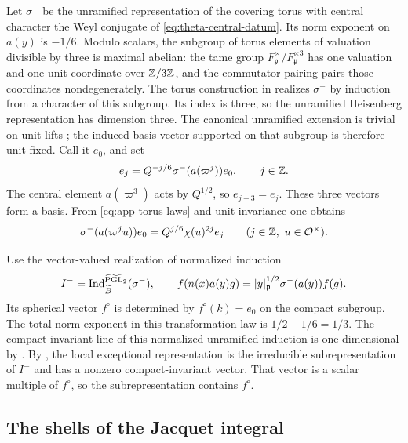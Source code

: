 Let \(\sigma^-\) be the unramified representation of the covering
torus with central character the Weyl conjugate of
\eqref{eq:theta-central-datum}.  Its norm exponent on \(a(y)\) is
\(-1/6\).  Modulo scalars, the subgroup of torus elements of
valuation divisible by three is maximal abelian: the tame group
\(F_{\mathfrak p}^\times/F_{\mathfrak p}^{\times3}\) has one
valuation and one unit coordinate over \(\mathbb{Z}/3\mathbb{Z}\), and the
commutator pairing pairs those coordinates nondegenerately.
The torus construction in \cite[Section~0.3, pp.~54--55, and
Section~I.1, p.~58]{KP84} realizes \(\sigma^-\) by induction from a
character of this subgroup.  Its index is three, so the unramified
Heisenberg representation has dimension three.  The canonical
unramified extension is trivial on unit lifts
\cite[Section~I.1, p.~60]{KP84}; the induced basis vector supported
on that subgroup is therefore unit fixed.  Call it \(e_0\), and set
\begin{equation}\label{eq:app-Heisenberg-basis}
 e_j=Q^{-j/6}\sigma^-(a(\varpi^j))e_0,\qquad j\in\mathbb{Z}.
\end{equation}
The central element \(a(\varpi^3)\) acts by \(Q^{1/2}\), so
\(e_{j+3}=e_j\).  These three vectors form a basis.  From
\eqref{eq:app-torus-laws} and unit invariance one obtains
\begin{equation}\label{eq:app-torus-on-e0}
 \sigma^-(a(\varpi^j u))e_0
   =Q^{j/6}\chi(u)^{2j}e_j
       \qquad(j\in\mathbb{Z},\ u\in\mathcal O^\times).
\end{equation}

Use the vector-valued realization of normalized induction
\[
 I^-=\operatorname{Ind}_{\widetilde B}^{\widetilde{\mathrm{PGL}}_2}
                   (\sigma^-),\qquad
 f(n(x)a(y)g)=|y|_{\mathfrak p}^{1/2}
                 \sigma^-(a(y))f(g).
\]
Its spherical vector \(f^\circ\) is determined by
\(f^\circ(k)=e_0\) on the compact subgroup.  The total norm exponent
in this transformation law is
\(1/2-1/6=1/3\).  The compact-invariant line of this normalized
unramified induction is one dimensional by
\cite[Lemma~I.1.3, p.~60]{KP84}.  By
\cite[Theorem~I.2.9(a),(f), p.~72]{KP84}, the local exceptional
representation is the irreducible subrepresentation of \(I^-\) and has
a nonzero compact-invariant vector.  That vector is a scalar multiple of
\(f^\circ\), so the subrepresentation contains \(f^\circ\).

\subsection{The shells of the Jacquet integral}

